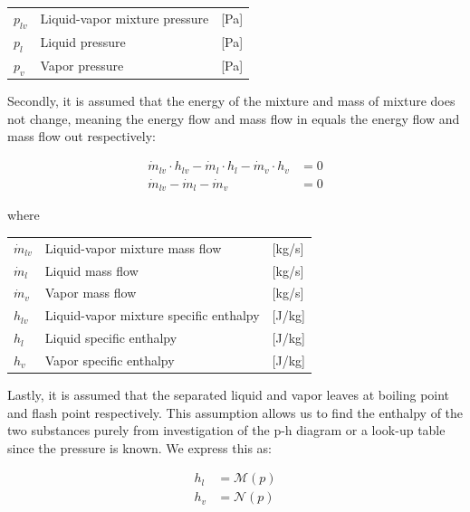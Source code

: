 \begin{center}
	\begin{tabular}{l p{8cm} l}
		$p_{lv}$				&  Liquid-vapor mixture pressure		& [\si{Pa}]\\
		$p_{l}$					&  Liquid pressure 						& [\si{Pa}] \\
		$p_{v}$					&  Vapor pressure						& [\si{Pa}]\\

	\end{tabular}
\end{center}


Secondly, it is assumed that the energy of the mixture and mass of mixture does not change, meaning the energy flow and mass flow in equals the energy flow and mass flow out respectively:

\begin{align}
	\dot{m}_{lv} \cdot  h_{lv}  - \dot{m}_{l} \cdot  h_{l} - \dot{m}_{v} \cdot  h_{v} & = 0 \label{eq:Flash_tank_energyflow} \\
	\dot{m}_{lv} - \dot{m}_{l} - \dot{m}_{v} & = 0  \label{eq:Flash_tank_massflow}
\end{align}

where

\begin{center}
	\begin{tabular}{l p{8cm} l}
		$\dot{m}_{lv}$			&  Liquid-vapor mixture mass flow			& [\si{kg}/\si{s}]\\
		$\dot{m}_{l}$			&  Liquid mass flow 						& [\si{kg}/\si{s}] \\
		$\dot{m}_{v}$			&  Vapor mass flow							& [\si{kg}/\si{s}]\\
		$h_{lv}$				&  Liquid-vapor mixture specific enthalpy	& [\si{J}/\si{kg}]\\
		$h_{l}$					&  Liquid specific enthalpy 				& [\si{J}/\si{kg}] \\
		$h_{v}$					&  Vapor specific enthalpy					& [\si{J}/\si{kg}]\\

	\end{tabular}
\end{center}


Lastly, it is assumed that the separated liquid and vapor leaves at boiling point and flash point respectively. This assumption allows us to find the enthalpy of the two substances purely from investigation of the p-h diagram or a look-up table since the pressure is known. We express this as:

\begin{align}
	h_{l}  & = \mathcal{M}(p)\\
	h_{v}  & = \mathcal{N}(p)
\end{align}

